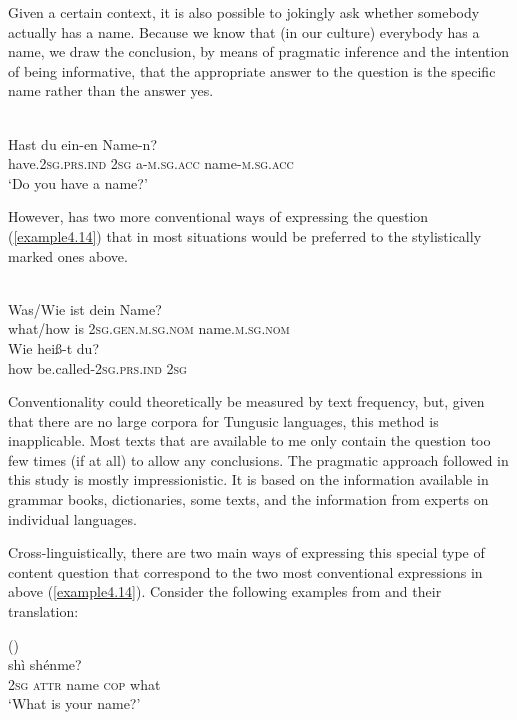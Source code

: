 \documentclass[output=paper,colorlinks,citecolor=brown]{langscibook}
\begin{document}
Given a certain context, it is also possible to jokingly ask whether somebody actually has a name. Because we know that (in our culture) everybody has a name, we draw the conclusion, by means of pragmatic inference and the intention of being informative, that the appropriate answer to the question is the specific name rather than the answer yes.

\ea
    \label{example4.13}
    \\
    \gll Hast			du		ein-en		Name-n?\\
    have.2\textsc{sg.prs.ind}	2\textsc{sg}		a-\textsc{m.sg.acc}	name-\textsc{m.sg.acc}\\
    \glt ‘Do you have a name?’
    \z

However,  has two more conventional ways of expressing the question (\ref{example4.14}) that in most situations would be preferred to the stylistically marked ones above.

\ea
    \label{example4.14}
    \\
    \ea
    \gll Was/Wie	ist		dein				Name?\\
    what/how		is		2\textsc{sg.gen.m.sg.nom}	name.\textsc{m.sg.nom}\\

    \ex
    \gll Wie		heiß-t				du?\\
    how		be.called-2\textsc{sg.prs.ind}	2\textsc{sg}\\
    \z
\z

Conventionality could theoretically be measured by text frequency, but, given that there are no large corpora for Tungusic languages, this method is inapplicable. Most texts that are available to me only contain the question too few times (if at all) to allow any conclusions. The pragmatic approach followed in this study is mostly impressionistic. It is based on the information available in grammar books, dictionaries, some texts, and the information from experts on individual languages.

Cross-linguistically, there are two main ways of expressing this special type of content question that correspond to the two most conventional expressions in  above (\ref{example4.14}). Consider the following examples from  and their  translation:\pagebreak

\ea
    \label{example4.15}
     ()\\
    \ea
    \gll [nǐ	de		míngzi]		shì		shénme?\\
    	2\textsc{sg} 	\textsc{attr}		name	\textsc{cop} what\\
    \glt ‘What is your name?’
\end{document}
